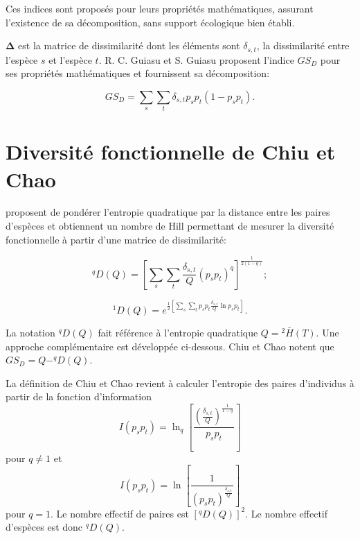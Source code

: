 \documentclass[
  11pt,
  french,
  a4paper,
  extrafontsizes,onecolumn,openright
  ]{memoir}
\begin{document}
Ces indices sont proposés pour leurs propriétés mathématiques, assurant l'existence de sa décomposition, sans support écologique bien établi.

\(\mathbf{\Delta}\) est la matrice de dissimilarité dont les éléments sont \(\delta_{s,t}\), la dissimilarité entre l'espèce \(s\) et l'espèce \(t\).
R. C. Guiasu et S. Guiasu \autocite*{Guiasu2011,Guiasu2012} proposent l'indice \(\mathit{{GS}_{D}}\) pour ses propriétés mathématiques et fournissent sa décomposition:

\begin{equation}
  \label{eq:Guiasu}
  \mathit{{GS}_{D}}=\sum_{s}{\sum_{t}{\delta_{s,t}p_{s}}}p_{t}\left(1-p_{s}p_{t}\right).
\end{equation}

\section{Diversité fonctionnelle de Chiu et Chao}\label{diversituxe9-fonctionnelle-de-chiu-et-chao}

\textcite{Chiu2014b} proposent de pondérer l'entropie quadratique par la distance entre les paires d'espèces et obtiennent un nombre de Hill permettant de mesurer la diversité fonctionnelle à partir d'une matrice de dissimilarité:

\begin{equation}
  \label{eq:Chiu2014bDq}
  ^{q}\!D\left(Q\right)
  = \left[\sum_s{\sum_t{\frac{\delta_{s,t}}{Q}\left(p_s p_t\right)^q}}\right]^\frac{1}{2\left(1-q\right)};
\end{equation}

\begin{equation}
  \label{eq:Chiu2014bD1}
  ^{1}\!D\left(Q\right)
  = e^{\frac{1}{2}\left[\sum_s{\sum_t{p_s p_t\frac{\delta_{s,t}}{Q}\ln{p_s p_t}}}\right]}.
\end{equation}

La notation \(^{q}\!D(Q)\) fait référence à l'entropie quadratique \(Q = {^{2}\!\bar{H}}(T)\).
Une approche complémentaire est développée ci-dessous.
Chiu et Chao notent que \(\mathit{{GS}_{D}} = Q - ^{q}\!D(Q)\).

La définition de Chiu et Chao revient à calculer l'entropie des paires d'individus à partir de la fonction d'information
\[I(p_s p_t) = \ln_q[\frac{(\frac{\delta_{s,t}}{Q})^{\frac{1}{1-q}}}{p_s p_t}]\]
pour \(q \ne 1\) et
\[I(p_s p_t) = \ln[\frac{1}{(p_s p_t)^{\frac{\delta_{s,t}}{Q}}}]\]
pour \(q=1\).
Le nombre effectif de paires est \([^{q}\!D(Q)]^2\). Le nombre effectif d'espèces est donc \(^{q}\!D(Q)\).
\end{document}
